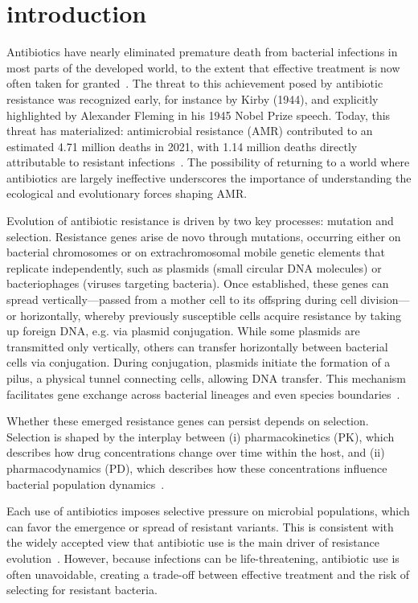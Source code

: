 \documentclass[../main.tex]{subfiles}
\begin{document}
\chapter{introduction}
Antibiotics have nearly eliminated premature death from bacterial infections in most parts of the developed world, to the extent that effective treatment is now often taken for granted~\cite{Hawkey2008}.
The threat to this achievement posed by antibiotic resistance was recognized early, for instance by Kirby (1944), and explicitly highlighted by Alexander Fleming in his 1945 Nobel Prize speech.
Today, this threat has materialized: antimicrobial resistance (AMR) contributed to an estimated 4.71 million deaths in 2021, with 1.14 million deaths directly attributable to resistant infections~\cite{Naghavi2024}.
The possibility of returning to a world where antibiotics are largely ineffective underscores the importance of understanding the ecological and evolutionary forces shaping AMR.

Evolution of antibiotic resistance is driven by two key processes: mutation and selection. Resistance genes arise de novo through mutations, occurring either on bacterial chromosomes or on extrachromosomal mobile genetic elements that replicate independently, such as plasmids (small circular DNA molecules) or bacteriophages (viruses targeting bacteria). Once established, these genes can spread vertically—passed from a mother cell to its offspring during cell division—or horizontally, whereby previously susceptible cells acquire resistance by taking up foreign DNA, e.g. via plasmid conjugation.
While some plasmids are transmitted only vertically, others can transfer horizontally between bacterial cells via conjugation. During conjugation, plasmids initiate the formation of a pilus, a physical tunnel connecting cells, allowing DNA transfer.
This mechanism facilitates gene exchange across bacterial lineages and even species boundaries~\cite{Frost2005, Smillie2010}.

Whether these emerged resistance genes can persist depends on selection.
Selection is shaped by the interplay between (i) pharmacokinetics (PK), which describes how drug concentrations change over time within the host, and (ii) pharmacodynamics (PD), which describes how these concentrations influence bacterial population dynamics~\cite{Regoes2004}.

Each use of antibiotics imposes selective pressure on microbial populations, which can favor the emergence or spread of resistant variants.
This is consistent with the widely accepted view that antibiotic use is the main driver of resistance evolution~\cite{Gregory2018}.
However, because infections can be life-threatening, antibiotic use is often unavoidable, creating a trade-off between effective treatment and the risk of selecting for resistant bacteria.
\end{document}
